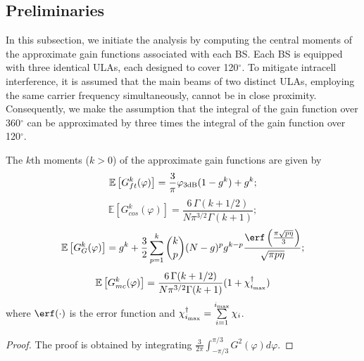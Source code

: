 \subsection{Preliminaries}
\label{ssec:prelim}
In this subsection, we initiate the analysis by computing the central moments of the approximate gain functions associated with each BS. Each BS is equipped with three identical ULAs, each designed to cover 120$^\circ$. To mitigate intracell interference, it is assumed that the main beams of two distinct ULAs, employing the same carrier frequency simultaneously, cannot be in close proximity. Consequently, we make the assumption that the integral of the gain function over 360$^\circ$ can be approximated by three times the integral of the gain function over 120$^\circ$.

\begin{proposition}\label{prop:gain}
    The $k$th moments ($k>0$) of the approximate gain functions are given by
    \begin{equation}\label{eq:mom_Gft}
        \mathbb E\left[G_{ft}^k(\varphi)\right] = \frac{3}{\pi} \varphi_{3\textrm{\normalfont dB}} (1-g^k) + g^k;
    \end{equation}
    \begin{equation}\label{eq:mom_Gcos}
        \mathbb E\left[G_{cos}^k(\varphi)\right] = \dfrac{6 \,\Gamma(k+1/2)}{N {\pi}^{3/2} \Gamma(k+1)};
    \end{equation}
    \begin{equation}\label{eq:mom_GG}
        \mathbb E\left[G_{G}^k(\varphi)\right] = g^k + \frac{3}{2} \sum\limits_{p = 1}^k  \binom{k}{p} (N-g)^p g^{k-p} \frac{\erf\left(\tfrac{\pi \sqrt{p \eta}}{3}\right)}{\sqrt{\pi p \eta}};
    \end{equation}
    \begin{equation}\label{eq:mom_Gmc}
        \mathbb E\left[G_{mc}^k(\varphi)\right] = \dfrac{6 \,\Gamma(k+1/2)}{N {\pi}^{3/2} \Gamma(k+1)} (1+\chi_{i_{\textrm{\normalfont max}}}^\dagger)
    \end{equation}
where $\erf(\cdot)$ is the error function and $\chi_{i_{\textrm{\normalfont max}}}^\dagger = \sum\limits_{i = 1}^{i_{\textrm{\normalfont max}}} \chi_i$.
\end{proposition}
\begin{proof}
    The proof is obtained by integrating $\frac{3}{2\pi}\int_{-\pi/3}^{\pi/3} \!G^2(\varphi) d\varphi$.
\end{proof}

